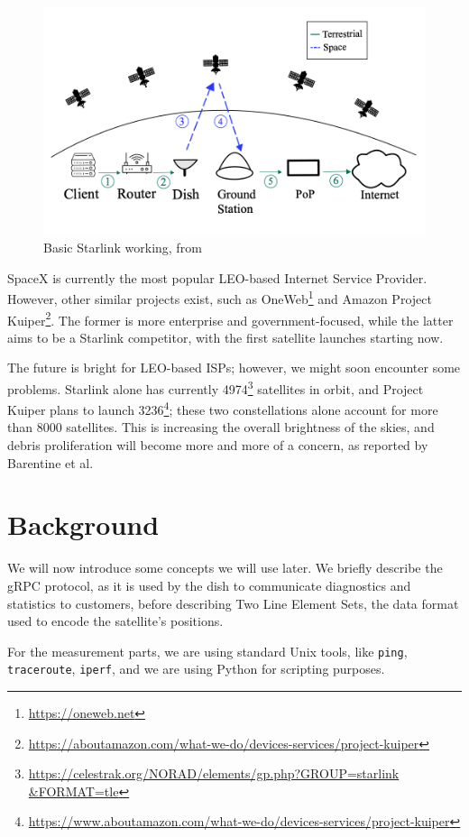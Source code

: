 \documentclass[IN,11pt,twoside,openright,idp,english]{tumthesis}
\begin{document}
\begin{figure}
    \centering
    \includegraphics[width=0.6\columnwidth]{img/starlink-101.png}
    \caption{Basic Starlink working, from \cite{izhikevich2023democratizing}}
    \label{fig:starlink-101}
\end{figure}      
    
SpaceX is currently the most popular LEO-based Internet Service Provider. However, other similar projects exist, such as
OneWeb\footnote{\url{https://oneweb.net}} and Amazon Project
Kuiper\footnote{\url{https://aboutamazon.com/what-we-do/devices-services/project-kuiper}}. The former is more enterprise
and government-focused, while the latter aims to be a Starlink competitor, with the first satellite launches starting
now.

The future is bright for LEO-based ISPs; however, we might soon encounter some problems. Starlink alone has currently
4974\footnote{\url{https://celestrak.org/NORAD/elements/gp.php?GROUP=starlink &FORMAT=tle}} satellites in orbit, and
Project Kuiper plans to launch
3236\footnote{\url{https://www.aboutamazon.com/what-we-do/devices-services/project-kuiper}}; these two constellations
alone account for more than 8000 satellites. This is increasing the overall brightness of the skies, and debris
proliferation will become more and more of a concern, as reported by Barentine et al. \cite{cite-key}
    
\section{Background}

We will now introduce some concepts we will use later. We briefly describe the gRPC protocol, as it is used by the dish
to communicate diagnostics and statistics to customers, before describing Two Line Element Sets, the data format used to
encode the satellite's positions. 

For the measurement parts, we are using standard Unix tools, like \texttt{ping}, \texttt{traceroute}, \texttt{iperf},
and we are using Python for scripting purposes.
\end{document}
